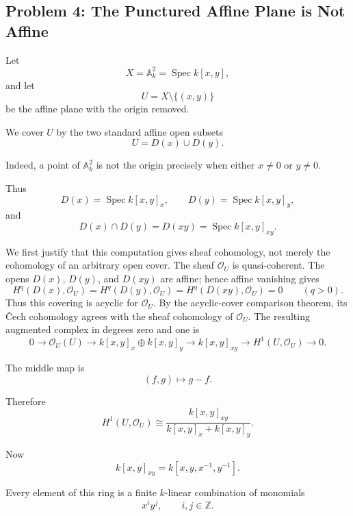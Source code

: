 
\subsection*{Problem 4: The Punctured Affine Plane is Not Affine}

Let
\[
X=\mathbb A_k^2=\operatorname{Spec}k[x,y],
\]
and let
\[
U=X\setminus\{(x,y)\}
\]
be the affine plane with the origin removed.

We cover \(U\) by the two standard affine open subsets
\[
U=D(x)\cup D(y).
\]

Indeed, a point of \(\mathbb A_k^2\) is not the origin precisely when either
\(x\neq 0\) or \(y\neq 0\).

Thus
\[
D(x)=\operatorname{Spec}k[x,y]_x,
\qquad
D(y)=\operatorname{Spec}k[x,y]_y,
\]
and
\[
D(x)\cap D(y)=D(xy)=\operatorname{Spec}k[x,y]_{xy}.
\]

We first justify that this computation gives sheaf cohomology, not
merely the cohomology of an arbitrary open cover. The sheaf
\(\mathcal O_U\) is quasi-coherent. The opens \(D(x)\), \(D(y)\), and
\(D(xy)\) are affine; hence affine vanishing gives
\[
H^q(D(x),\mathcal O_U)=H^q(D(y),\mathcal O_U)
=H^q(D(xy),\mathcal O_U)=0\qquad(q>0).
\]
Thus this covering is acyclic for \(\mathcal O_U\). By the
acyclic-cover comparison theorem, its \v{C}ech cohomology agrees with
the sheaf cohomology of \(\mathcal O_U\). The resulting augmented
complex in degrees zero and one is
\[
0
\longrightarrow
\mathcal O_U(U)
\longrightarrow
k[x,y]_x\oplus k[x,y]_y
\longrightarrow
k[x,y]_{xy}
\longrightarrow
H^1(U,\mathcal O_U)
\longrightarrow 0.
\]

The middle map is
\[
(f,g)\longmapsto g-f.
\]

Therefore
\[
H^1(U,\mathcal O_U)
\cong
\frac{k[x,y]_{xy}}{k[x,y]_x+k[x,y]_y}.
\]

Now
\[
k[x,y]_{xy}=k[x,y,x^{-1},y^{-1}].
\]

Every element of this ring is a finite \(k\)-linear combination of monomials
\[
x^iy^j,
\qquad i,j\in\mathbb Z.
\]

